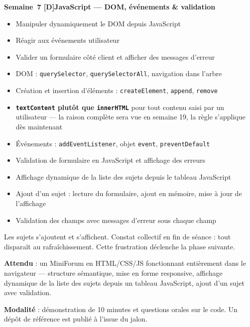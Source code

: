 \documentclass[a4paper,11pt]{article}
\newcommand{\semainetitre}[4]{%
  \needspace{9\baselineskip}%
  \vspace{8pt}
  \noindent
  \begin{tcolorbox}[
    enhanced, colback=cfptBlack, colframe=cfptBlack,
    boxrule=0pt, arc=3pt, boxsep=0pt,
    left=8pt, right=90pt, top=4pt, bottom=4pt,
    overlay={%
      \node[anchor=east, fill=cfptYellow, text=cfptBlack,
            rounded corners=2pt, inner xsep=6pt, inner ysep=3pt,
            font=\scriptsize\bfseries]
        at ([xshift=-6pt]frame.east) {#3};}
  ]
  \color{white}\bfseries\small Semaine~#1 \quad\textcolor{cfptYellow}{[#4]}\quad #2
  \end{tcolorbox}
  \vspace{-4pt}
}
\newcommand{\contenutitre}[1]{%
  \vspace{4pt}
  \noindent{\small\color{accentBlue}\textbf{#1}}\vspace{2pt}
}
\begin{document}
\semainetitre{7}{JavaScript --- DOM, événements \& validation}{3h cours / 4h TP}{D}
\begin{tcolorbox}[semaine]
\begin{tcolorbox}[objectifs]
\begin{itemize}
  \item Manipuler dynamiquement le DOM depuis JavaScript
  \item Réagir aux événements utilisateur
  \item Valider un formulaire côté client et afficher des messages d'erreur
\end{itemize}
\end{tcolorbox}
\vspace{4pt}
\contenutitre{Cours}
\begin{itemize}
  \item DOM : \texttt{querySelector}, \texttt{querySelectorAll}, navigation dans l'arbre
  \item Création et insertion d'éléments : \texttt{createElement}, \texttt{append}, \texttt{remove}
  \item \textbf{\texttt{textContent} plutôt que \texttt{innerHTML}} pour tout contenu saisi par un utilisateur --- la raison complète sera vue en semaine 19, la règle s'applique dès maintenant
  \item Événements : \texttt{addEventListener}, objet \texttt{event}, \texttt{preventDefault}
  \item Validation de formulaire en JavaScript et affichage des erreurs
\end{itemize}
\contenutitre{Travaux pratiques}
\begin{itemize}
  \item Affichage dynamique de la liste des sujets depuis le tableau JavaScript
  \item Ajout d'un sujet : lecture du formulaire, ajout en mémoire, mise à jour de l'affichage
  \item Validation des champs avec messages d'erreur sous chaque champ
\end{itemize}
\end{tcolorbox}
\begin{tcolorbox}[filrouge={Forum interactif\dots mais volatile}]
\small Les sujets s'ajoutent et s'affichent. Constat collectif en fin de séance : tout disparaît au rafraîchissement. Cette frustration déclenche la phase suivante.
\end{tcolorbox}

\begin{tcolorbox}[jalon, title={Jalon 1 --- fin de semaine 7 (10\%)}]
\small
\textbf{Attendu} : un MiniForum en HTML/CSS/JS fonctionnant entièrement dans le navigateur --- structure sémantique, mise en forme responsive, affichage dynamique de la liste des sujets depuis un tableau JavaScript, ajout d'un sujet avec validation.

\textbf{Modalité} : démonstration de 10 minutes et questions orales sur le code. Un dépôt de référence est publié à l'issue du jalon.
\end{tcolorbox}
\end{document}
